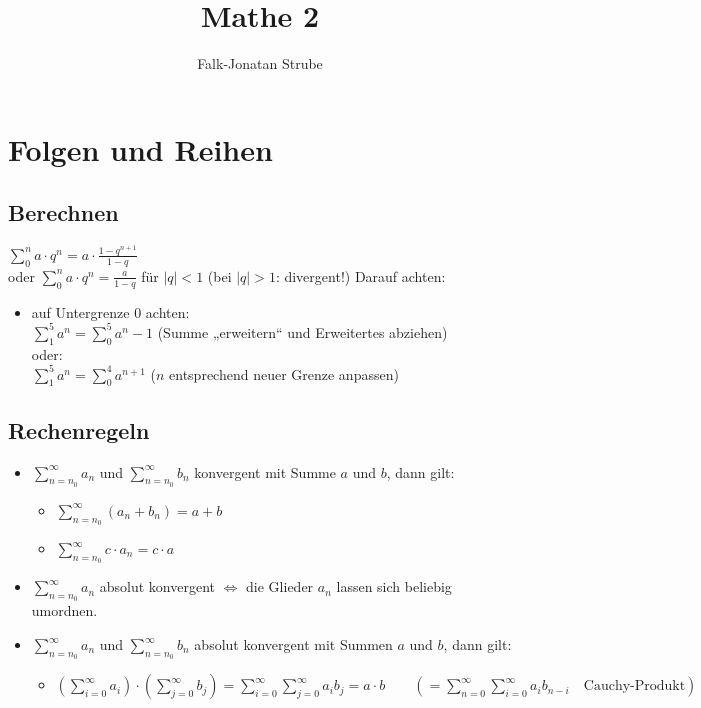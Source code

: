 \documentclass{scrreprt}
\title{Mathe 2}
\author{Falk-Jonatan Strube}
\begin{document}
\maketitle
\tableofcontents

\chapter{Folgen und Reihen}
\section{Berechnen}
$\sum_0^n a \cdot q^n=a\cdot \frac{1-q^{n+1}}{1-q}$\\
oder $\sum_0^n a \cdot q^n=\frac{a}{1-q}$ für $|q|<1$ (bei $|q|>1$: divergent!)
Darauf achten:
\begin{itemize}
\item auf Untergrenze $0$ achten:\\
$\sum_1^5 a^n = \sum_0^5 a^n -1$ (Summe „erweitern“ und Erweitertes abziehen)\\
oder:\\
$\sum_1^5 a^n = \sum_0^4 a^{n+1}$ ($n$ entsprechend neuer Grenze anpassen)
\end{itemize}
\section{Rechenregeln}
\begin{itemize}
\item $\sum_{n=n_0}^\infty a_n$ und $\sum_{n=n_0}^\infty b_n$ konvergent mit Summe $a$ und $b$, dann gilt: 
\begin{itemize}
\item $\sum_{n=n_0}^\infty (a_n+b_n)= a + b$
\item $\sum_{n=n_0}^\infty c\cdot a_n= c\cdot a$
\end{itemize}
\item $\sum_{n=n_0}^\infty a_n$ absolut konvergent $\Leftrightarrow$ die Glieder $a_n$ lassen sich beliebig umordnen.
\item $\sum_{n=n_0}^\infty a_n$ und $\sum_{n=n_0}^\infty b_n$ absolut konvergent mit Summen $a$ und $b$, dann gilt:
\begin{itemize}
\item $\left(\sum_{i=0}^\infty a_i\right)\cdot \left( \sum_{j=0}^\infty b_j\right)=\sum_{i=0}^\infty  \sum_{j=0}^\infty a_i b_j=a\cdot b \qquad \left( =\sum_{n=0}^\infty  \sum_{i=0}^\infty a_i b_{n-i} \quad \text{Cauchy-Produkt}\right)$
\end{itemize}
\end{itemize}
\end{document}
